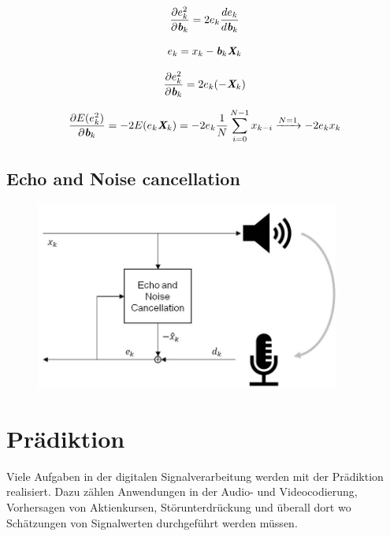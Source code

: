 \documentclass[
    10pt, %
    DIV12,
    english, %
    a5paper, %
    twoside, %
    titlepage, %
    parskip=half, %
    headings=small, %
    listof=totoc, %
    bibliography=totoc, %
    index=totoc, %
    captions=tableheading, %
    final %
]{scrbook}
\begin{document}
\begin{equation}
\frac{\partial e_k^2}{\partial \textit{\textbf{b}}_k}=2e_k\frac{de_k}{d \textit{\textbf{b}}_k} \nonumber
\end{equation}

\begin{equation}
e_k=x_k-\textit{\textbf{b}}_k \textit{\textbf{X}}_k \nonumber
\end{equation}

\begin{equation}
\frac{\partial e_k^2}{\partial \textit{\textbf{b}}_k}=2e_k(-\textit{\textbf{X}}_k)\nonumber
\end{equation}

\begin{equation}
\frac{\partial E(e_k^2)}{\partial \textit{\textbf{b}}_k}=-2E(e_k\textit{\textbf{X}}_k)=-2e_k \frac{1}{N}\sum_{i=0}^{N-1}x_{k-i}\xrightarrow{N=1}-2e_kx_k\nonumber
\end{equation}

\section{Echo and Noise cancellation}

\begin{figure}[H]
\centering
\includegraphics[width=10cm]{../Images/EchoNoiseCancellation.jpg}
\end{figure}

\chapter{Prädiktion}
Viele Aufgaben in der digitalen Signalverarbeitung werden mit der Prädiktion realisiert. Dazu zählen Anwendungen in der Audio- und Videocodierung, Vorhersagen von Aktienkursen, 
Störunterdrückung und überall dort wo Schätzungen von Signalwerten durchgeführt werden müssen.
\end{document}
